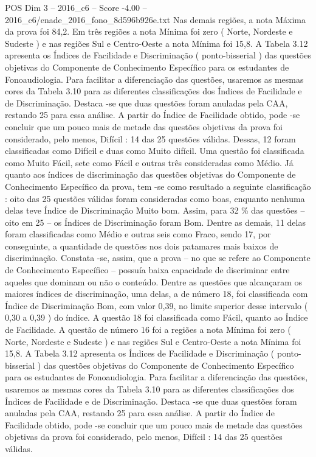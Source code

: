 \begin{textsample}{POS Dim 3 – 2016\_c6 – Score -4.00 – 2016\_c6/enade\_2016\_fono\_8d596b926e.txt}
Nas demais regiões, a nota Máxima da prova foi 84,2.
Em três regiões a nota Mínima foi zero ( Norte, Nordeste e Sudeste ) e nas regiões Sul e Centro-Oeste a nota Mínima foi 15,8.
A Tabela 3.12 apresenta os Índices de Facilidade e Discriminação ( ponto-bisserial ) das questões objetivas do Componente de Conhecimento Específico para os estudantes de Fonoaudiologia.
Para facilitar a diferenciação das questões, usaremos as mesmas cores da Tabela 3.10 para as diferentes classificações dos Índices de Facilidade e de Discriminação.
Destaca -se que duas questões foram anuladas pela CAA, restando 25 para essa análise.
A partir do Índice de Facilidade obtido, pode -se concluir que um pouco mais de metade das questões objetivas da prova foi considerado, pelo menos, Difícil : 14 das 25 questões válidas.
Dessas, 12 foram classificadas como Difícil e duas como Muito difícil.
Uma questão foi classificada como Muito Fácil, sete como Fácil e outras três consideradas como Médio.
Já quanto aos índices de discriminação das questões objetivas do Componente de Conhecimento Específico da prova, tem -se como resultado a seguinte classificação : oito das 25 questões válidas foram consideradas como boas, enquanto nenhuma delas teve Índice de Discriminação Muito bom.
Assim, para 32 \% das questões – oito em 25 – os Índices de Discriminação foram Bom.
Dentre as demais, 11 delas foram classificadas como Médio e outras seis como Fraco, sendo 17, por conseguinte, a quantidade de questões nos dois patamares mais baixos de discriminação.
Constata -se, assim, que a prova – no que se refere ao Componente de Conhecimento Específico – possuía baixa capacidade de discriminar entre aqueles que dominam ou não o conteúdo.
Dentre as questões que alcançaram os maiores índices de discriminação, uma delas, a de número 18, foi classificada com Índice de Discriminação Bom, com valor 0,39, no limite superior desse intervalo ( 0,30 a 0,39 ) do índice.
A questão 18 foi classificada como Fácil, quanto ao Índice de Facilidade.
A questão de número 16 foi a regiões a nota Mínima foi zero ( Norte, Nordeste e Sudeste ) e nas regiões Sul e Centro-Oeste a nota Mínima foi 15,8.
A Tabela 3.12 apresenta os Índices de Facilidade e Discriminação ( ponto-bisserial ) das questões objetivas do Componente de Conhecimento Específico para os estudantes de Fonoaudiologia.
Para facilitar a diferenciação das questões, usaremos as mesmas cores da Tabela 3.10 para as diferentes classificações dos Índices de Facilidade e de Discriminação.
Destaca -se que duas questões foram anuladas pela CAA, restando 25 para essa análise.
A partir do Índice de Facilidade obtido, pode -se concluir que um pouco mais de metade das questões objetivas da prova foi considerado, pelo menos, Difícil : 14 das 25 questões válidas.

\end{textsample}
